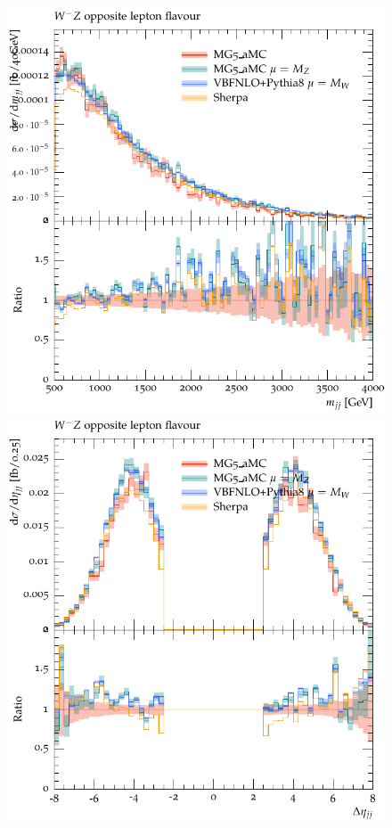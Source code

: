 \begin{figure}[htbp]
\begin{center}
   \includegraphics[scale=0.65]{figs/WmZ_OF_mjj}
   \includegraphics[scale=0.65]{figs/WmZ_OF_dEtajj}

\end{center}
\end{figure}
